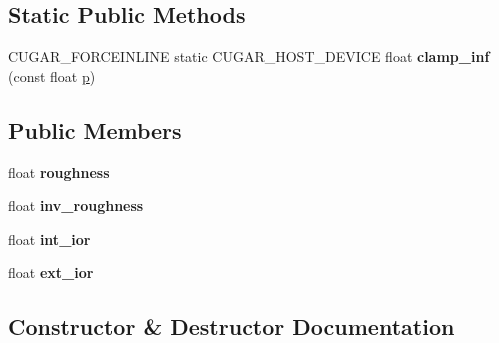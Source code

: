 \subsection*{Static Public Methods}
\begin{DoxyCompactItemize}
\item 
\mbox{\label{structcugar_1_1_g_g_x_smith_bsdf_ab276fff8154b7925504bfd41bd4b757d}} 
C\+U\+G\+A\+R\+\_\+\+F\+O\+R\+C\+E\+I\+N\+L\+I\+NE static C\+U\+G\+A\+R\+\_\+\+H\+O\+S\+T\+\_\+\+D\+E\+V\+I\+CE float {\bfseries clamp\+\_\+inf} (const float \hyperlink{structcugar_1_1_g_g_x_smith_bsdf_a8cc733f9120c3b196b54a8df79116dfc}{p})
\end{DoxyCompactItemize}
\subsection*{Public Members}
\begin{DoxyCompactItemize}
\item 
\mbox{\label{structcugar_1_1_g_g_x_smith_bsdf_aa74611de1ee56ea1e2322a842b93efe2}} 
float {\bfseries roughness}
\item 
\mbox{\label{structcugar_1_1_g_g_x_smith_bsdf_aafe4ff20f93ee83e3abfa5581dfc8f39}} 
float {\bfseries inv\+\_\+roughness}
\item 
\mbox{\label{structcugar_1_1_g_g_x_smith_bsdf_ad466000d260e93649919768f03b0e5a8}} 
float {\bfseries int\+\_\+ior}
\item 
\mbox{\label{structcugar_1_1_g_g_x_smith_bsdf_a42329e782a1fb75dc4cc2035e0e967ac}} 
float {\bfseries ext\+\_\+ior}
\end{DoxyCompactItemize}


\subsection{Constructor \& Destructor Documentation}
\mbox{\label{structcugar_1_1_g_g_x_smith_bsdf_ab90265f2877e5687b0ee232628223f9f}} 
